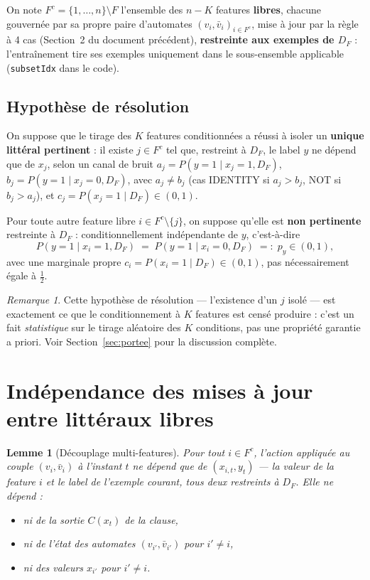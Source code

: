\documentclass[12pt,a4paper]{article}
\newtheorem{lemma}[theorem]{Lemme}
\theoremstyle{remark}
\newtheorem{remark}{Remarque}[section]
\newcommand{\vbar}{\bar{v}}
\newcommand{\DF}{D_F}
\begin{document}
On note $F^c = \{1,\ldots,n\}\setminus F$ l'ensemble des $n-K$ features
\textbf{libres}, chacune gouvernée par sa propre paire d'automates $(v_i,\vbar_i)_{i\in F^c}$,
mise à jour par la règle à 4 cas (Section~2 du document précédent), \textbf{restreinte
aux exemples de $\DF$} : l'entraînement tire ses exemples uniquement dans le
sous-ensemble applicable (\texttt{subsetIdx} dans le code).

\subsection{Hypothèse de résolution}

On suppose que le tirage des $K$ features conditionnées a réussi à isoler un
\textbf{unique littéral pertinent} : il existe $j\in F^c$ tel que, restreint à
$\DF$, le label $y$ ne dépend que de $x_j$, selon un canal de bruit
$a_j = P(y=1\mid x_j=1,\DF)$, $b_j = P(y=1\mid x_j=0,\DF)$, avec $a_j\ne b_j$
(cas IDENTITY si $a_j>b_j$, NOT si $b_j>a_j$), et $c_j = P(x_j=1\mid \DF)\in(0,1)$.

Pour toute autre feature libre $i\in F^c\setminus\{j\}$, on suppose qu'elle est
\textbf{non pertinente} restreinte à $\DF$ : conditionnellement indépendante de $y$,
c'est-à-dire
\[
  P(y=1\mid x_i=1,\DF) \;=\; P(y=1\mid x_i=0,\DF) \;=:\; p_y \in(0,1),
\]
avec une marginale propre $c_i = P(x_i=1\mid\DF)\in(0,1)$, pas nécessairement égale à
$\tfrac12$.

\begin{remark}
Cette hypothèse de résolution --- l'existence d'un $j$ isolé --- est exactement ce
que le conditionnement à $K$ features est censé produire : c'est un fait
\emph{statistique} sur le tirage aléatoire des $K$ conditions, pas une propriété
garantie a priori. Voir Section~\ref{sec:portee} pour la discussion complète.
\end{remark}

\section{Indépendance des mises à jour entre littéraux libres}

\begin{lemma}[Découplage multi-features]\label{lem:decouplage_multi}
Pour tout $i\in F^c$, l'action appliquée au couple $(v_i,\vbar_i)$ à l'instant $t$
ne dépend que de $(x_{i,t}, y_t)$ --- la valeur de la feature $i$ et le label de
l'exemple courant, tous deux restreints à $\DF$. Elle ne dépend :
\begin{itemize}
  \item ni de la sortie $C(x_t)$ de la clause,
  \item ni de l'état des automates $(v_{i'},\vbar_{i'})$ pour $i'\ne i$,
  \item ni des valeurs $x_{i'}$ pour $i'\ne i$.
\end{itemize}
\end{lemma}
\end{document}

